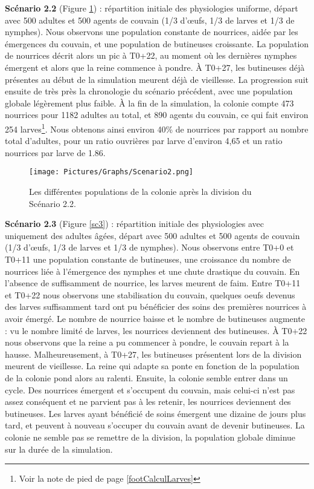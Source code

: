 		\textbf{Scénario 2.2} (Figure \ref{sc2}) : répartition initiale des physiologies uniforme, départ avec 500 adultes et 500 agents de couvain (1/3 d'œufs, 1/3 de larves et 1/3 de nymphes). Nous observons une population constante de nourrices, aidée par les émergences du couvain, et une population de butineuses croissante. La population de nourrices décrit alors un pic à T0+22, au moment où les dernières nymphes émergent et alors que la reine commence à pondre. À T0+27, les butineuses déjà présentes au début de la simulation meurent déjà de vieillesse. La progression suit ensuite de très près la chronologie du scénario précédent, avec une population globale légèrement plus faible. À la fin de la simulation, la colonie compte 473 nourrices pour 1182 adultes au total, et 890 agents du couvain, ce qui fait environ 254 larves\footnote{Voir la note de pied de page \ref{footCalculLarves}}. Nous obtenons ainsi environ 40\% de nourrices par rapport au nombre total d'adultes, pour un ratio ouvrières par larve d'environ 4,65 et un ratio nourrices par larve de 1.86.
	
	\begin{figure}
	\centering
	\texttt{[image: Pictures/Graphs/Scenario2.png]}
	\caption{Les différentes populations de la colonie après la division du Scénario 2.2.}
	\label{sc2}
	\end{figure}
		
		\textbf{Scénario 2.3} (Figure \ref{sc3}) : répartition initiale des physiologies avec uniquement des adultes âgées, départ avec 500 adultes et 500 agents de couvain (1/3 d'œufs, 1/3 de larves et 1/3 de nymphes). Nous observons entre T0+0 et T0+11 une population constante de butineuses, une croissance du nombre de nourrices liée à l'émergence des nymphes et une chute drastique du couvain. En l'absence de suffisamment de nourrice, les larves meurent de faim. Entre T0+11 et T0+22 nous observons une stabilisation du couvain, quelques oeufs devenus des larves suffisamment tard ont pu bénéficier des soins des premières nourrices à avoir émergé. Le nombre de nourrice baisse et le nombre de butineuses augmente : vu le nombre limité de larves, les nourrices deviennent des butineuses. À T0+22 nous observons que la reine a pu commencer à pondre, le couvain repart à la hausse. Malheureusement, à T0+27, les butineuses présentent lors de la division meurent de vieillesse. La reine qui adapte sa ponte en fonction de la population de la colonie pond alors au ralenti. Ensuite, la colonie semble entrer dans un cycle. Des nourrices émergent et s'occupent du couvain, mais celui-ci n'est pas assez conséquent et ne parvient pas à les retenir, les nourrices deviennent des butineuses. Les larves ayant bénéficié de soins émergent une dizaine de jours plus tard, et peuvent à nouveau s'occuper du couvain avant de devenir butineuses. La colonie ne semble pas se remettre de la division, la population globale diminue sur la durée de la simulation.
	
